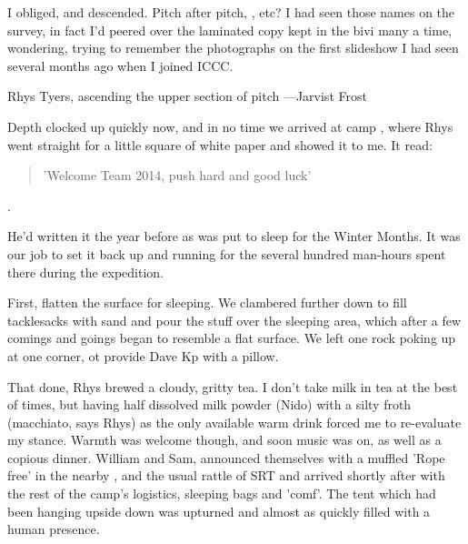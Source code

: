 I obliged, and descended. Pitch after pitch, ,  etc? I had seen those names on the survey, in fact I'd peered over the laminated copy kept in the bivi many a time, wondering, trying to remember the photographs on the first slideshow I had seen several months ago when I joined ICCC.


\begin{marginfigure}
\checkoddpage \ifoddpage \forcerectofloat \else \forceversofloat \fi
\centering
 \caption{Rhys Tyers, ascending the upper section of \protect{} pitch ---Jarvist Frost}
 \label{Laurel-up}
\end{marginfigure}

Depth clocked up quickly now, and in no time we arrived at camp , where Rhys went straight for a little square of white paper and showed it to me. It read:

\begin{quote}
'Welcome Team 2014, push hard and good luck'
\end{quote}. 

He'd written it the year before as  was put to sleep for the Winter Months. It was our job to set it back up and running for the several hundred man-hours spent there during the expedition. 

First, flatten the surface for sleeping. We clambered further down  to fill tacklesacks with sand and pour the stuff over the sleeping area, which after a few comings and goings began to  resemble a flat surface. We left one rock poking up at one corner, ot provide Dave Kp with a pillow. 

That done, Rhys brewed a cloudy, gritty tea. I don't take milk in tea at the best of times, but having half dissolved milk powder (Nido) with a silty froth (macchiato, says Rhys) as the only available warm drink forced me to re-evaluate my stance. Warmth was welcome though, and soon music was on, as well as a copious dinner. William and Sam, announced themselves with a muffled 'Rope free' in the nearby , and the usual rattle of SRT and arrived shortly after with the rest of the camp's logistics, sleeping bags and 'comf'. The tent which had been hanging upside down was upturned and almost as quickly filled with a human presence. 

